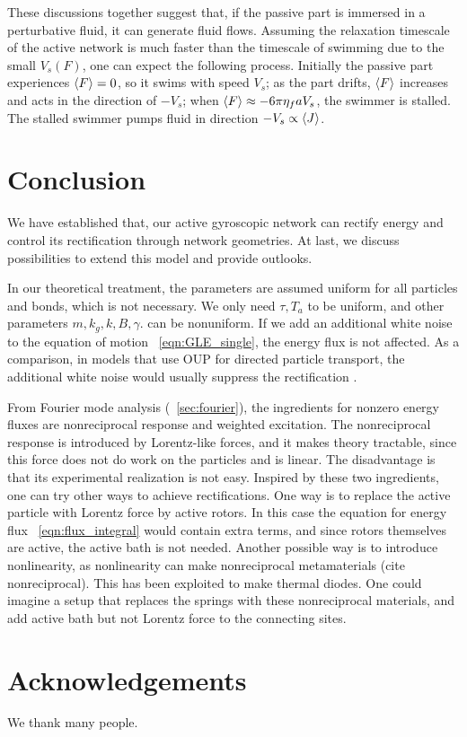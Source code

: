 \documentclass[
 preprint,
 preprintnumbers,
 amsmath,amssymb,
 aps,
 pre,
 longbibliography,
 superscriptaddress,
 10pt, twocolumn
]{revtex4-1}
\begin{document}
These discussions together suggest that, if the passive part is immersed in a perturbative fluid, it can generate fluid flows.
Assuming the relaxation timescale of the active network is much faster than the timescale of swimming due to the small $V_s(F)$, one can expect the following process. Initially the passive part experiences $\expval{F}=0$, so it swims with speed $V_s$; as the part drifts, $\expval{F}$ increases and acts in the direction of $-V_s$; when $\expval{F} \approx -6\pi\eta_f a V_s$, the swimmer is stalled. The stalled swimmer pumps fluid in direction $-V_s \propto \expval{J}$.


\section{Conclusion} \label{sec:conclusion}

We have established that, our active gyroscopic network can rectify energy and control its rectification through network geometries.
At last, we discuss possibilities to extend this model and provide outlooks.

In our theoretical treatment, the parameters are assumed uniform for all particles and bonds, which is not necessary. We only need $\tau,T_a$ to be uniform, and other parameters $m, k_g, k, B, \gamma$. can be nonuniform.
If we add an additional white noise to the equation of motion \eqnname~\eqref{eqn:GLE_single}, the energy flux is not affected. As a comparison, in models that use OUP for directed particle transport, the additional white noise would usually suppress the rectification \cite{Bartussek1996PreciseNumerics}.

From Fourier mode analysis (\secname~\ref{sec:fourier}), the ingredients for nonzero energy fluxes are nonreciprocal response and weighted excitation.
The nonreciprocal response is introduced by Lorentz-like forces, and it makes theory tractable, since this force does not do work on the particles and is linear. The disadvantage is that its experimental realization is not easy.
Inspired by these two ingredients, one can try other ways to achieve rectifications.
One way is to replace the active particle with Lorentz force by active rotors. In this case the equation for energy flux \eqnname~\eqref{eqn:flux_integral} would contain extra terms, and since rotors themselves are active, the active bath is not needed.
Another possible way is to introduce nonlinearity, as nonlinearity can make nonreciprocal metamaterials  (cite nonreciprocal). This has been exploited to make thermal diodes. One could imagine a setup that replaces the springs with these nonreciprocal materials, and add active bath but not Lorentz force to the connecting sites.



\section*{Acknowledgements}
We thank many people.



\end{document}
